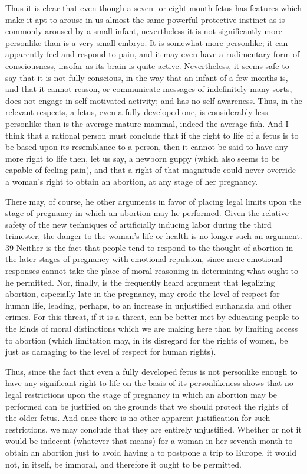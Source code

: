 Thus it is clear that even though a seven- or eight-month
fetus has features which make it apt to arouse in us almost
the same powerful protective instinct as is commonly
aroused by a small infant, nevertheless it is not
significantly more personlike than is a very small embryo.
It is somewhat more personlike; it can apparently feel and
respond to pain, and it may even have a rudimentary form
of consciousness, insofar as its brain is quite active.
Nevertheless, it seems safe to say that it is not fully
conscious, in the way that an infant of a few months is,
and that it cannot reason, or communicate messages of
indefinitely many sorts, does not engage in self-motivated
activity; and has no self-awareness. Thus, in the relevant
respects, a fetus, even a fully developed one, is
considerably less personlike than is the average mature
mammal, indeed the average fish. And I think that a
rational person must conclude that if the right to life of a
fetus is to be based upon its resemblance to a person, then
it cannot be said to have any more right to life then, let us
say, a newborn guppy (which also seems to be capable of
feeling pain), and that a right of that magnitude could
never override a woman’s right to obtain an abortion, at
any stage of her pregnancy.

There may, of course, he other arguments in favor of
placing legal limits upon the stage of pregnancy in which
an abortion may he performed. Given the relative safety
of the new techniques of artificially inducing labor during
the third trimester, the danger to the woman’s life or
health is no longer such an argument.
39 Neither is the fact that people tend to respond to the
thought of abortion in the later stages of pregnancy with
emotional repulsion, since mere emotional responses
cannot take the place of moral reasoning in determining
what ought to he permitted. Nor, finally, is the frequently
heard argument that legalizing abortion, especially late in
the pregnancy, may erode the level of respect for human
life, leading, perhaps, to an increase in unjustified
euthanasia and other crimes. For this threat, if it is a
threat, can be better met by educating people to the kinds
of moral distinctions which we are making here than by
limiting access to abortion (which limitation may, in its
disregard for the rights of women, be just as damaging to
the level of respect for human rights).

Thus, since the fact that even a fully developed fetus is not
personlike enough to have any significant right to life on
the basis of its personlikeness shows that no legal
restrictions upon the stage of pregnancy in which an
abortion may be performed can be justified on the
grounds that we should protect the rights of the older
fetus. And once there is no other apparent justification for
such restrictions, we may conclude that they are entirely
unjustified. Whether or not it would be indecent
(whatever that means) for a woman in her seventh month
to obtain an abortion just to avoid having a to postpone a
trip to Europe, it would not, in itself, be immoral, and
therefore it ought to be permitted.

